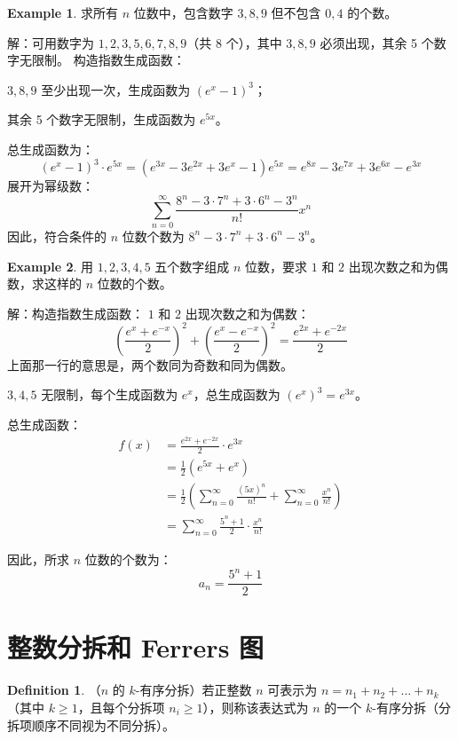 \documentclass[oneside]{book}
\theoremstyle{definition}
\newtheorem{example}{Example}[section]
\newtheorem{definition}{Definition}[section]
\begin{document}
\begin{example}
	求所有 \( n \) 位数中，包含数字 \( 3,8,9 \) 但不包含 \( 0,4 \) 的个数。
	
	解：可用数字为 \( 1,2,3,5,6,7,8,9 \)（共 8 个），其中 \( 3,8,9 \) 必须出现，其余 5 个数字无限制。
	构造指数生成函数：
	
	\( 3,8,9 \) 至少出现一次，生成函数为 \( (e^x - 1)^3 \)；
	
	其余 5 个数字无限制，生成函数为 \( e^{5x} \)。
	
	总生成函数为：
	\[
	(e^x - 1)^3 \cdot e^{5x} = (e^{3x} - 3e^{2x} + 3e^x - 1)e^{5x} = e^{8x} - 3e^{7x} + 3e^{6x} - e^{3x}
	\]
	展开为幂级数：
	\[
	\sum_{n=0}^{\infty} \frac{8^n - 3 \cdot 7^n + 3 \cdot 6^n - 3^n}{n!} x^n
	\]
	因此，符合条件的 \( n \) 位数个数为 \( 8^n - 3 \cdot 7^n + 3 \cdot 6^n - 3^n \)。
\end{example}
\begin{example}
	用 \( 1,2,3,4,5 \) 五个数字组成 \( n \) 位数，要求 \( 1 \) 和 \( 2 \) 出现次数之和为偶数，求这样的 \( n \) 位数的个数。
\end{example}

解：构造指数生成函数：
\( 1 \) 和 \( 2 \) 出现次数之和为偶数：
\[
(\frac{e^x + e^{-x} }{2})^2+ (\frac{e^x - e^{-x} }{2})^2= \frac{e^{2x} + e^{-2x}}{2}
\]
上面那一行的意思是，两个数同为奇数和同为偶数。

\( 3,4,5 \) 无限制，每个生成函数为 \( e^x \)，总生成函数为 \( (e^x)^3 = e^{3x} \)。

总生成函数：
\[
\begin{aligned}
	f(x) &= \frac{e^{2x} + e^{-2x}}{2} \cdot e^{3x} \\
	&= \frac{1}{2}(e^{5x} + e^{x}) \\
	&= \frac{1}{2}\left( \sum_{n=0}^{\infty} \frac{(5x)^n}{n!} + \sum_{n=0}^{\infty} \frac{x^n}{n!} \right) \\
	&= \sum_{n=0}^{\infty} \frac{5^n + 1}{2} \cdot \frac{x^n}{n!}
\end{aligned}
\]

因此，所求 \( n \) 位数的个数为：
\[
a_n = \frac{5^n + 1}{2}
\]

\section{整数分拆和 Ferrers 图}

\begin{definition}
	（\( n \) 的 \( k \)-有序分拆）若正整数 \( n \) 可表示为 \( n = n_1 + n_2 + \dots + n_k \)（其中 \( k \geq 1 \)，且每个分拆项 \( n_i \geq 1 \)），则称该表达式为 \( n \) 的一个 \( k \)-有序分拆（分拆项顺序不同视为不同分拆）。
\end{definition}
\end{document}
